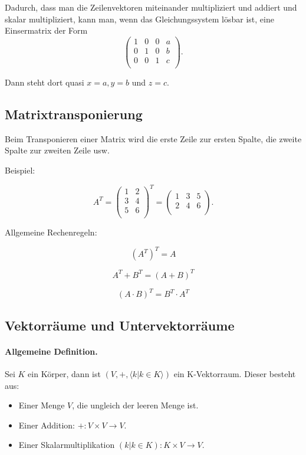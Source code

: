 \documentclass{scrartcl}
\begin{document}
Dadurch, dass man die Zeilenvektoren miteinander multipliziert und addiert und skalar multipliziert, kann man, wenn
das Gleichungssystem lösbar ist, eine Einsermatrix der Form
\begin{equation}
	\left(
	\begin{array}{ccc|c}
		1 & 0 & 0 & a\\
		0 & 1 & 0 & b\\
		0 & 0 & 1 & c\\
	\end{array}
	\right).
\end{equation}

Dann steht dort quasi $x = a, y = b$ und $z = c$.

\subsection{Matrixtransponierung}

Beim Transponieren einer Matrix wird die erste Zeile zur ersten Spalte, die zweite Spalte zur zweiten Zeile usw.

Beispiel:

\begin{equation}
	A^T = \begin{pmatrix*}
		1 & 2\\
		3 & 4\\
		5 & 6\\
	\end{pmatrix*}^T = \begin{pmatrix*}
		1 & 3 & 5\\
		2 & 4 & 6\\
	\end{pmatrix*}.
\end{equation}

Allgemeine Rechenregeln:

$$ (A^T)^T = A $$

$$ A^T + B^T = (A + B)^T $$

$$ (A \cdot B)^T = B^T \cdot A^T $$

\subsection{Vektorräume und Untervektorräume}

\paragraph{Allgemeine Definition.} Sei $K$ ein Körper, dann ist $(V, +, \langle k | k \in K\rangle)$ ein K-Vektorraum.
Dieser besteht aus:
\begin{itemize}
	\item Einer Menge $V$, die ungleich der leeren Menge ist.
	\item Einer Addition: $+: V\times V \rightarrow V$.
	\item Einer Skalarmultiplikation $(k|k\in K): K\times V \rightarrow V$.
\end{itemize}
\end{document}
